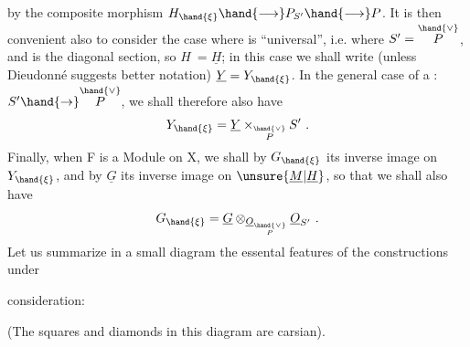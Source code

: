 
by the composite morphism $H_{\hand{\xi}} \hand{\longrightarrow} P_{S'} \hand{\longrightarrow} P$. It is then convenient
 also to consider the case where \hand{$\xi$} is
``universal'', i.e. where $S' = \overset{\hand{\vee}}{P}$, and \hand{$\xi$} is the diagonal section, so $H \ = \underline{H}$;
in this case we shall write (unless Dieudonné suggests better notation)
$\underline{Y} = Y_{\hand{\xi}}$. In the general case of a \hand{$\xi$}: $S' \hand{\to} \overset{\hand{\vee}}{P}$, we shall therefore also have
\[ Y_{\hand{\xi}} = \underline{Y} \times_{\overset{\hand{\vee}}{P}} S' \ . \]
Finally, when F is a Module on X, we shall  by $G_{\hand{\xi}}$ its inverse image
on $Y_{\hand{\xi}}$, and by $\underline{G}$ its inverse image on $\unsure{\underline{M}|\underline{H}}$, so that we shall also have
\[ G_{\hand{\xi}} = \underline{G} \otimes_{\underline{O}_{\overset{\hand{\vee}}{P}}} \underline{O}_{S'} \ . \]
Let us summarize in a small diagram the essental features of the constructions  under

consideration:

(The squares and diamonds in this diagram are carsian).

